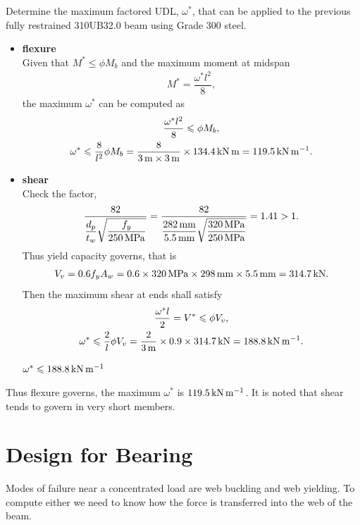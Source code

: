 \begin{exmp}
Determine the maximum factored UDL, $\omega^*$, that can be applied to the previous fully restrained 310UB32.0 beam using Grade 300 steel.
\end{exmp}
\begin{solution}
\begin{itemize}
\item \textbf{flexure}\\
Given that $M^*\leqslant\phi{}M_b$ and the maximum moment at midspan
\begin{gather*}
M^*=\dfrac{\omega^*l^2}{8},
\end{gather*}
the maximum $\omega^*$ can be computed as
\begin{gather*}
\dfrac{\omega^*l^2}{8}\leqslant\phi{}M_b,\\
\omega^*\leqslant\dfrac{8}{l^2}\phi{}M_b=\dfrac{8}{\SI{3}{\meter}\times\SI{3}{\meter}}\times\SI{134.4}{\kilo\newton\meter}=\SI{119.5}{\kilo\newton\per\meter}.
\end{gather*}
\item \textbf{shear}\\
Check the factor,
\begin{gather*}
\dfrac{82}{\dfrac{d_p}{t_w}\sqrt{\dfrac{f_y}{\SI{250}{\mega\pascal}}}}=\dfrac{82}{\dfrac{\SI{282}{\milli\meter}}{\SI{5.5}{\milli\meter}}\sqrt{\dfrac{\SI{320}{\mega\pascal}}{\SI{250}{\mega\pascal}}}}=1.41>1.
\end{gather*}
Thus yield capacity governs, that is
\begin{gather*}
V_v=0.6f_yA_w=0.6\times\SI{320}{\mega\pascal}\times\SI{298}{\milli\meter}\times\SI{5.5}{\milli\meter}=\SI{314.7}{\kilo\newton}.
\end{gather*}
Then the maximum shear at ends shall satisfy
\begin{gather*}
\dfrac{\omega^*l}{2}=V^*\leqslant\phi{}V_v,\\
\omega^*\leqslant\dfrac{2}{l}\phi{}V_v=\dfrac{2}{\SI{3}{\meter}}\times0.9\times\SI{314.7}{\kilo\newton}=\SI{188.8}{\kilo\newton\per\meter}.
\end{gather*}
\begin{flushright}
$\omega^*\leqslant\SI{188.8}{\kilo\newton\per\meter}$
\end{flushright}
\end{itemize}
Thus flexure governs, the maximum $\omega^*$ is $\SI{119.5}{\kilo\newton\per\meter}$.
It is noted that shear tends to govern in very short members.
\end{solution}
\section{Design for Bearing}
Modes of failure near a concentrated load are web buckling and web yielding.
To compute either we need to know how the force is transferred into the web of the beam.

